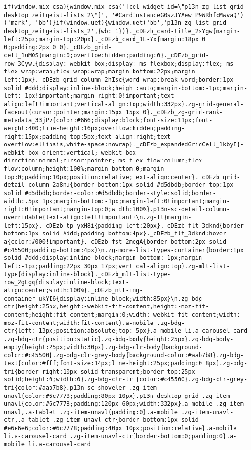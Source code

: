 \documentclass[
]{article}
\begin{document}
\begin{verbatim}
if(window.mix_csa){window.mix_csa('[cel_widget_id=\"p13n-zg-list-grid-desktop_zeitgeist-lists_2\"]', '#CardInstanceG0szJYAew_P9WRhfcMwvaQ')('mark', 'bb')}if(window.uet){window.uet('bb','p13n-zg-list-grid-desktop_zeitgeist-lists_2',{wb: 1})}._cDEzb_card-title_2sYgw{margin-left:25px;margin-top:20px}._cDEzb_card_1L-Yx{margin:18px 0 0;padding:2px 0 0}._cDEzb_grid-cell_1uMOS{margin:0;overflow:hidden;padding:0}._cDEzb_grid-row_3Cywl{display:-webkit-box;display:-ms-flexbox;display:flex;-ms-flex-wrap:wrap;flex-wrap:wrap;margin-bottom:22px;margin-left:1px}._cDEzb_grid-column_2hIsc{word-wrap:break-word;border:1px solid #ddd;display:inline-block;height:auto;margin-bottom:-1px;margin-left:-1px!important;margin-right:0!important;text-align:left!important;vertical-align:top;width:332px}.zg-grid-general-faceout{cursor:pointer;margin:15px 15px 0}._cDEzb_zg-grid-rank-metadata_33jPv{color:#666;display:block;font-size:11px;font-weight:400;line-height:16px;overflow:hidden;padding-right:15px;padding-top:5px;text-align:right;text-overflow:ellipsis;white-space:nowrap}._cDEzb_expandedGridCell_1kbyI{-webkit-box-orient:vertical;-webkit-box-direction:normal;cursor:pointer;-ms-flex-flow:column;flex-flow:column;height:100%;margin-bottom:0;margin-top:0;padding:10px;position:relative;text-align:center}._cDEzb_grid-detail-column_2a8nu{border-bottom:1px solid #d5dbdb;border-top:1px solid #d5dbdb;border-color:#d5dbdb;border-style:solid;border-width:.5px 1px;margin-bottom:-1px;margin-left:0!important;margin-right:0!important;margin-top:0;width:100%}.p13n-sc-detail-column-overridable{text-align:left!important}\n.zg-ft{margin-left:15px}._cDEzb_tp_yxH8i{padding-left:20px}._cDEzb_flt_3dknd{border-bottom:1px solid #ddd;padding-bottom:4px}._cDEzb_flt_3dknd:hover a{color:#000!important}._cDEzb_fst_2megA{border-bottom:2px solid #c45500;padding-bottom:4px}\n.zg-more-list-types-container{border:1px solid #ddd;display:inline-block;margin-bottom:-1px;margin-left:-1px;padding:22px 30px 17px;vertical-align:top}.zg-mlt-list-type{display:inline-block}._cDEzb_mlt-list-type-row_2gLgq{display:inline-block;text-align:center;width:100%}._cDEzb_mlt-img-container_ukYI6{display:inline-block;width:85px}\n.zg-bdg-ctr{height:25px;height:-webkit-fit-content;height:-moz-fit-content;height:fit-content;margin:0;width:-webkit-fit-content;width:-moz-fit-content;width:fit-content}.a-mobile .zg-bdg-ctr{left:-13px;position:absolute;top:-5px}.a-mobile li.a-carousel-card .zg-bdg-ctr{position:static}.zg-bdg-body{height:25px}.zg-bdg-body-empty{height:25px;width:30px}.zg-bdg-clr-body{background-color:#c45500}.zg-bdg-clr-grey-body{background-color:#aab7b8}.zg-bdg-text{color:#fff;font-size:14px;line-height:25px;padding:0 8px}.zg-bdg-tri{border-right:10px solid transparent;border-top:25px solid;height:0;width:0}.zg-bdg-clr-tri{color:#c45500}.zg-bdg-clr-grey-tri{color:#aab7b8}.p13n-sc-shoveler .zg-item-unavl{color:#6c7778;padding:80px 10px}.p13n-desktop-grid .zg-item-unavl{color:#6c7778;padding:120px 60px;width:332px}.a-mobile .zg-item-unavl,.a-tablet .zg-item-unavl{padding:0}.a-mobile .zg-item-unavl-ctr,.a-tablet .zg-item-unavl-ctr{border-bottom:1px solid #e6e6e6;color:#6c7778;padding:40px 10px;position:relative}.a-mobile li.a-carousel-card .zg-item-unavl-ctr{border-bottom:0;padding:0}.a-mobile li.a-carousel-card 
\end{verbatim}
\end{document}

